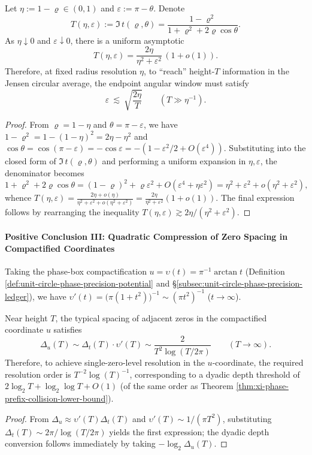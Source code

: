 \begin{theorem}\label{thm:xi-endpoint-angle-height-exchange}
Let \(\eta:=1-\varrho\in(0,1)\) and \(\varepsilon:=\pi-\theta\).
Denote
\[
T(\eta,\varepsilon):=\Im\,t(\varrho,\theta)=\frac{1-\varrho^2}{1+\varrho^2+2\varrho\cos\theta}.
\]
As \(\eta\downarrow 0\) and \(\varepsilon\downarrow 0\), there is a uniform asymptotic
\[
T(\eta,\varepsilon)=\frac{2\eta}{\eta^2+\varepsilon^2}\,(1+o(1)).
\]
Therefore, at fixed radius resolution \(\eta\), to ``reach'' height-\(T\) information in the Jensen circular average, the endpoint angular window must satisfy
\[
\varepsilon \ \lesssim\ \sqrt{\frac{2\eta}{T}}
\qquad (T\gg \eta^{-1}).
\]
\end{theorem}
\begin{proof}
From \(\varrho=1-\eta\) and \(\theta=\pi-\varepsilon\), we have
\(
1-\varrho^2=1-(1-\eta)^2=2\eta-\eta^2
\)
and
\(
\cos\theta=\cos(\pi-\varepsilon)=-\cos\varepsilon=-(1-\varepsilon^2/2+O(\varepsilon^4)).
\)
Substituting into the closed form of \(\Im\,t(\varrho,\theta)\) and performing a uniform expansion in \(\eta,\varepsilon\), the denominator becomes
\[
1+\varrho^2+2\varrho\cos\theta
=(1-\varrho)^2+\varrho\varepsilon^2+O(\varepsilon^4+\eta\varepsilon^2)
=\eta^2+\varepsilon^2+o(\eta^2+\varepsilon^2),
\]
whence
\(
T(\eta,\varepsilon)=\frac{2\eta+o(\eta)}{\eta^2+\varepsilon^2+o(\eta^2+\varepsilon^2)}
=\frac{2\eta}{\eta^2+\varepsilon^2}(1+o(1))
\).
The final expression follows by rearranging the inequality \(T(\eta,\varepsilon)\gtrsim 2\eta/(\eta^2+\varepsilon^2)\). \qedhere
\end{proof}

\paragraph{Positive Conclusion III: Quadratic Compression of Zero Spacing in Compactified Coordinates}
Taking the phase-box compactification \(u=\upsilon(t)=\pi^{-1}\arctan t\) (Definition \ref{def:unit-circle-phase-precision-potential} and \S\ref{subsec:unit-circle-phase-precision-ledger}), we have
\(
\upsilon'(t)=\bigl(\pi(1+t^2)\bigr)^{-1}\sim (\pi t^2)^{-1}
\) (\(t\to\infty\)).
\begin{corollary}\label{cor:xi-compactified-spacing-quadratic}
Near height \(T\), the typical spacing of adjacent zeros in the compactified coordinate \(u\) satisfies
\[
\Delta_u(T)\sim \Delta_t(T)\cdot \upsilon'(T)\sim \frac{2}{T^2\log(T/2\pi)}
\qquad(T\to\infty).
\]
Therefore, to achieve single-zero-level resolution in the \(u\)-coordinate, the required resolution order is \(T^{-2}\log(T)^{-1}\), corresponding to a dyadic depth threshold of \(2\log_2 T+\log_2\log T+O(1)\) (of the same order as Theorem \ref{thm:xi-phase-prefix-collision-lower-bound}).
\end{corollary}
\begin{proof}
From \(\Delta_u\approx \upsilon'(T)\Delta_t(T)\) and \(\upsilon'(T)\sim 1/(\pi T^2)\), substituting \(\Delta_t(T)\sim 2\pi/\log(T/2\pi)\) yields the first expression; the dyadic depth conversion follows immediately by taking \(-\log_2\Delta_u(T)\). \qedhere
\end{proof}

